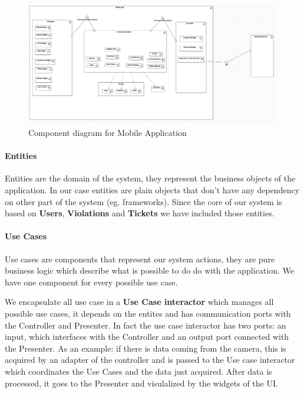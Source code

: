 \begin{figure}
\centering
\includegraphics[width=\textwidth]{Images/COMP-MOBILE.png}
\caption{\label{fig:compdiag1} Component diagram for Mobile Application}
\end{figure}

\paragraph{Entities}
Entities are the domain of the system, they represent the business objects of the application. In our case entities are plain objects that don't have any dependency on other part of the system (eg. frameworks).
Since the core of our system is based on \textbf{Users}, \textbf{Violations} and \textbf{Tickets} we have included those entities.

\paragraph{Use Cases}
Use cases are components that represent our system actions, they are pure business logic which describe what is possible to do do with the application. We have one component for every possible use case.

We encapsulate all use case in a \textbf{Use Case interactor} which manages all possible use cases, it depends on the entites and has communication ports with the Controller and Presenter.
In fact the use case interactor has two ports: an input, which interfaces with the Controller and an output port connected with the Presenter. As an example: if there is data coming from the camera, this is acquired by an adapter of the controller and is passed to the Use case interactor which coordinates the Use Cases and the data just acquired. After data is processed, it goes to the Presenter and visulalized by the widgets of the UI.

